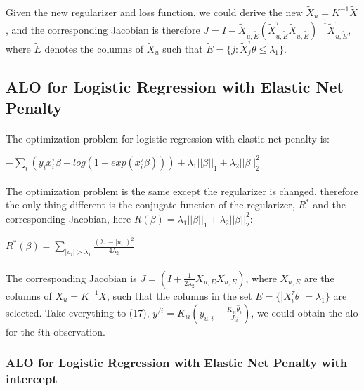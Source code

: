 \documentclass{article}
\begin{document}
\paragraph{}Given the new regularizer and loss function, we could derive the new $\tilde{X}_{u} = K^{-1}\tilde{X}$, and the corresponding Jacobian is therefore $J = I -\tilde{X}_{u,\tilde{E}}(\tilde{X}_{u,\tilde{E}}^{\tau}\tilde{X}_{u,\tilde{E}})^{-1}\tilde{X}_{u,\tilde{E}}^{\tau}$, where $\tilde{E}$ denotes the columns of $\tilde{X}_{u}$ such that $\tilde{E} = \{j:\tilde{X}_{j}^{\tau}\theta \leq \lambda_{1}\}$.
\subsection{ALO for Logistic Regression with Elastic Net Penalty}
\paragraph{}The optimization problem for logistic regression with elastic net penalty is:
\begin{center}
$-\sum\limits_{i}(y_{i}x_{i}^{\tau}\beta+log(1+exp(x_{i}^{\tau}\beta)))+\lambda_{1}||\beta||_{1}+\lambda_{2}||\beta||_{2}^{2}$
\end{center}
\paragraph{}The optimization problem is the same except the regularizer is changed, therefore the only thing different is the conjugate function of the regularizer, $R^{*}$ and the corresponding Jacobian, here $R(\beta) = \lambda_{1}||\beta||_{1}+\lambda_{2}||\beta||_{2}^{2}$:
\begin{center}
$R^{*}(\beta) = \sum\limits_{|u_{i}| > \lambda_{1}} \frac{(\lambda_{1}-|u_{i}|)^{2}}{4\lambda_{2}}$
\end{center}
\paragraph{}The corresponding Jacobian is $J = (I + \frac{1}{2\lambda_{2}}X_{u,E}X_{u,E}^{\tau})$, where $X_{u,E}$ are the columns of $X_{u}=K^{-1}X$, such that the columns in the set $E = \{|X_{i}^{\tau}\theta| = \lambda_{1}\}$ are selected. Take everything to (17), $y^{/i} = K_{ii}(y_{u,i}-\frac{K_{ii}\hat{\theta}_{i}}{J_{ii}})$, we could obtain the alo for the $i$th observation.
\subsubsection{ALO for Logistic Regression with Elastic Net Penalty with intercept}
\end{document}
